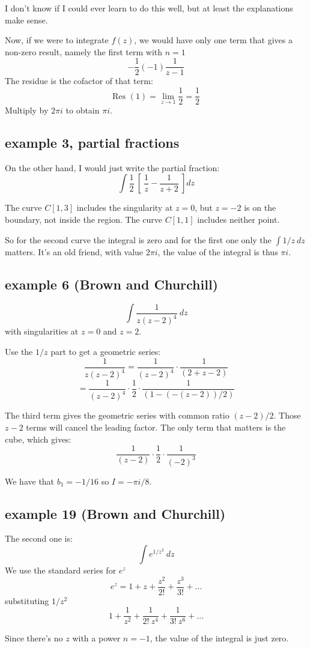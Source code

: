 \documentclass[11pt, oneside]{article}
\begin{document}
I don't know if I could ever learn to do this well, but at least the explanations make sense.

Now, if we were to integrate $f(z)$, we would have only one term that gives a non-zero result, namely the first term with $n=1$
\[ - \frac{1}{2} (-1) \frac{1}{z-1} \]
The residue is the cofactor of that term:
\[ \text{Res }(1) = \lim_{z \rightarrow 1} \frac{1}{2} = \frac{1}{2} \]
Multiply by $2 \pi i$ to obtain $\pi i$.

\subsection*{example 3, partial fractions}

On the other hand, I would just write the partial fraction:
\[ \int \frac{1}{2} \ [ \ \frac{1}{z} - \frac{1}{z + 2} \ ] dz \]

The curve $C[1,3]$ includes the singularity at $z = 0$, but $z = -2$ is on the boundary, not inside the region.  The curve $C[1,1]$ includes neither point.

So for the second curve the integral is zero and for the first one only the $\int 1/z \ dz$ matters.  It's an old friend, with value $2 \pi i$, the value of the integral is thus $\pi i$.

\subsection*{example 6 (Brown and Churchill)}

\label{sec:ex6L}

\[ \int \frac{1}{z(z-2)^4} \ dz \]
with singularities at $z = 0$ and $z = 2$.

Use the $1/z$ part to get a geometric series:
\[ \frac{1}{z(z-2)^4} = \frac{1}{(z-2)^4} \cdot \frac{1}{(2 + z - 2)} \]
\[ = \frac{1}{(z-2)^4} \cdot \frac{1}{2} \cdot \frac{1}{(1 - (-(z-2))/2 )} \]

The third term gives the geometric series with common ratio $(z-2)/2$.  Those $z-2$ terms will cancel the leading factor.  The only term that matters is the cube, which gives:
\[  \frac{1}{(z-2)} \cdot \frac{1}{2} \cdot \frac{1}{(-2)^3} \]

We have that $b_1 = -1/16$ so $I = -\pi i/8$.

\subsection*{example 19 (Brown and Churchill)}

\label{sec:ex19L}

The second one is:
\[ \int e^{1/z^2} \ dz \]
We use the standard series for $e^z$
\[ e^z = 1 + z + \frac{z^2}{2!} + \frac{z^3}{3!} + \dots \]
substituting $1/z^2$
\[ 1 + \frac{1}{z^2} + \frac{1}{2! \ z^4} + \frac{1}{3! \ z^6} + \dots \]

Since there's no $z$ with a power $n=-1$, the value of the integral is just zero.
\end{document}

